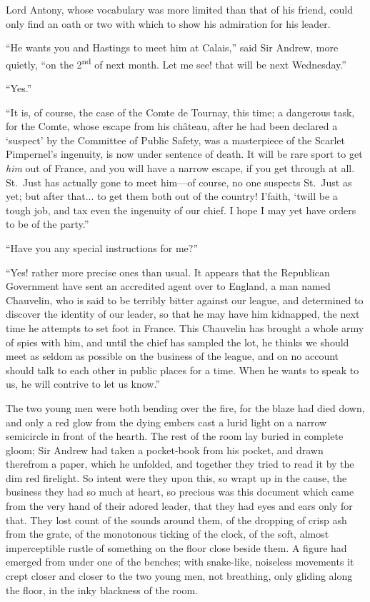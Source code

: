 \documentclass[paper=5.5in:8.5in,BCOR=7mm,twoside,DIV=calc,12pt,usegeometry,chapterprefix,endperiod,headings=big]{scrbook}
\begin{document}
Lord Antony, whose vocabulary was more limited than that of his friend, could only find an oath or two with which to show his admiration for his leader.

\enquote{He wants you and Hastings to meet him at Calais,} said Sir Andrew, more quietly, \enquote{on the 2\textsuperscript{nd} of next month. Let me see! that will be next Wednesday.}

\enquote{Yes.}

\enquote{It is, of course, the case of the Comte de Tournay, this time; a dangerous task, for the Comte, whose escape from his château, after he had been declared a \enquote{suspect} by the Committee of Public Safety, was a masterpiece of the Scarlet Pimpernel's ingenuity, is now under sentence of death. It will be rare sport to get \textit{him} out of France, and you will have a narrow escape, if you get through at all. St.~Just has actually gone to meet him---of course, no one suspects St.~Just as yet; but after that... to get them both out of the country! I'faith, `twill be a tough job, and tax even the ingenuity of our chief. I hope I may yet have orders to be of the party.}

\enquote{Have you any special instructions for me?}

\enquote{Yes! rather more precise ones than usual. It appears that the Republican Government have sent an accredited agent over to England, a man named Chauvelin, who is said to be terribly bitter against our league, and determined to discover the identity of our leader, so that he may have him kidnapped, the next time he attempts to set foot in France. This Chauvelin has brought a whole army of spies with him, and until the chief has sampled the lot, he thinks we should meet as seldom as possible on the business of the league, and on no account should talk to each other in public places for a time. When he wants to speak to us, he will contrive to let us know.}

The two young men were both bending over the fire, for the blaze had died down, and only a red glow from the dying embers cast a lurid light on a narrow semicircle in front of the hearth. The rest of the room lay buried in complete gloom; Sir Andrew had taken a pocket-book from his pocket, and drawn therefrom a paper, which he unfolded, and together they tried to read it by the dim red firelight. So intent were they upon this, so wrapt up in the cause, the business they had so much at heart, so precious was this document which came from the very hand of their adored leader, that they had eyes and ears only for that. They lost count of the sounds around them, of the dropping of crisp ash from the grate, of the monotonous ticking of the clock, of the soft, almost imperceptible rustle of something on the floor close beside them. A figure had emerged from under one of the benches; with snake-like, noiseless movements it crept closer and closer to the two young men, not breathing, only gliding along the floor, in the inky blackness of the room.
\end{document}
